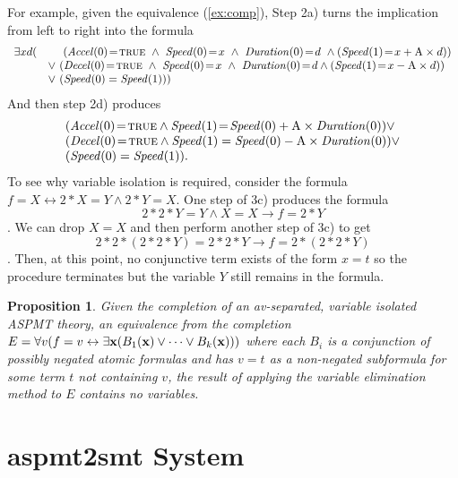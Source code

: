 \documentclass[runningheads]{llncs}
\def\ba{\begin{array}}
\def\ea{\end{array}}
\def\i#1{\hbox{\it #1\/}}
\def\mvis{\!=\!}
\def\true{\hbox{\sc true}}
\newtheorem{prop}{Proposition}
\newcommand{\cblu}{\color{blue}}
\begin{document}
For example, given the equivalence (\ref{ex:comp}),
Step 2a) turns the implication from left to right into the formula
{\small
\[
\ba{rl}
\exists xd (& 
              ~~~~(\i{Accel}(0)\mvis\true\ \land \ 
               \i{Speed}(0)\mvis x\ \land\  
               \i{Duration}(0)\mvis d\ \land (\i{Speed}(1)\mvis x+{\rm A}\times d) ) \\
             & \lor \ 
              (\i{Decel}(0)\mvis\true\ \land \ 
               \i{Speed}(0)\mvis x\ \land\  
               \i{Duration}(0)\mvis d \land (\i{Speed}(1)\mvis x-{\rm A}\times d) ) \\
             & \lor \ 
               (\i{Speed}(0) = \i{Speed}(1)))
\ea
\]
}
And then step 2d) produces
{\small
\[
\ba{l}
(\i{Accel}(0)\mvis\true\land \i{Speed}(1)\mvis \i{Speed}(0) 
      + {\rm A}\times\i{Duration}(0)) \lor \\
(\i{Decel}(0)\mvis\true\land \i{Speed}(1) = \i{Speed}(0) - {\rm
  A}\times \i{Duration}(0)) \lor \\
(\i{Speed}(0) = \i{Speed}(1)).
\ea
\]
}
\BOCC
To see why variable isolation is required, consider the {\cblu formula} $f = X \leftrightarrow 2*X = Y \land 2*Y = X$. One step of 3c) produces the formula 
$$2*2*Y = Y \land X = X \rightarrow f = 2*Y$$. We can drop $X = X$ and then perform another step of 3c) to get $$2*2*(2*2*Y) = 2*2*Y \rightarrow f = 2*(2*2*Y)$$. Then, at this point, no conjunctive term exists of the 
form $x = t$ so the procedure terminates but the variable $Y$ still remains in the formula.
\EOCC


\BOCC
\begin{prop}\label{prop:elim2}\optional{prop:elim2}
Given the completion of an av-separated, variable isolated ASPMT theory, an equivalence from the completion $E = \forall v(f = v \leftrightarrow \exists {\bf x} (B_1({\bf x}) \lor \dots \lor B_k({\bf x})))$ where each $B_i$ is a conjunction of possibly negated atomic formulas and has $v = t$ as a non-negated subformula for some term $t$ not containing $v$, the result of applying the variable elimination method to $E$ contains no variables.
\end{prop}
\EOCC

\vspace{-0.5cm}
\section{{\sc aspmt2smt} System}\label{sec:system}
\end{document}
